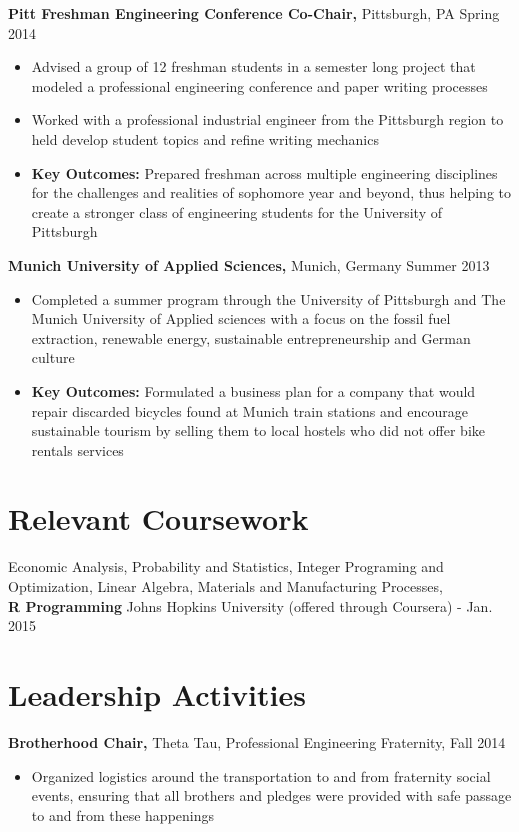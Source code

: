 \documentclass[margin]{res}
\begin{document}
\begin{resume}
 
 
{\bf Pitt Freshman Engineering Conference Co-Chair,} Pittsburgh, PA \hfill  Spring 2014
\begin{itemize} \itemsep -2pt %
\item Advised a group of 12 freshman students in a semester long project that modeled a professional engineering conference and paper writing processes
\item Worked with a professional industrial engineer from the Pittsburgh region to held develop student topics and refine writing mechanics
\item \textbf{Key Outcomes:} Prepared freshman across multiple engineering disciplines for the challenges and realities of sophomore year and beyond, thus helping to create a stronger class of engineering students for the University of Pittsburgh
\end{itemize}

{\bf Munich University of Applied Sciences,} Munich, Germany \hfill Summer 2013
\begin{itemize} \itemsep -2pt %
\item Completed a summer program through the University of Pittsburgh and The Munich University of Applied sciences with a focus on the fossil fuel extraction, renewable energy, sustainable entrepreneurship and German culture
\item \textbf{Key Outcomes:} Formulated a business plan for a company that would repair discarded bicycles found at Munich train stations and encourage sustainable tourism by selling them to local hostels who did not offer bike rentals services
\end{itemize}

\section{Relevant Coursework}
Economic Analysis, Probability and Statistics, Integer Programing and Optimization, Linear Algebra, Materials and Manufacturing Processes, %
\\{\bf R Programming} Johns Hopkins University (offered through Coursera) - Jan. 2015


\section{Leadership   Activities} 
		{\bf Brotherhood Chair,} Theta Tau, Professional Engineering Fraternity, \hfill Fall 2014 
                \begin{itemize} \itemsep -2pt
                 \item  Organized logistics around the transportation to and from fraternity social events, ensuring that all brothers and pledges were provided with safe passage to and from these happenings
		 		\end{itemize}


\end{resume}
\end{document}
